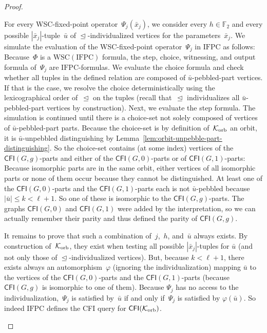 \documentclass[]{lmcs}
\renewcommand{\phi}{\varphi}
\newcommand{\FF}{\mathbb{F}}
\newcommand{\formA}{\Phi}
\newcommand{\formB}{\Psi}
\newcommand{\auto}{\phi}
\newcommand{\tup}[1]{\bar{#1}}
\newcommand{\vertA}{u}
\newcommand{\IFPC}{\ensuremath{\mathrm{IFPC}}}
\newcommand{\WSCof}[1]{\mathrm{WSC}(#1)}
\newcommand{\CFIsym}{\mathsf{CFI}}
\newcommand{\CFI}[1]{\CFIsym(#1)}
\newcommand{\indRel}{\trianglelefteq}
\newenvironment{claimproof}[1][\proofname]{\begin{claimprooftemp}[#1]\renewcommand*{\qedsymbol}{\(\dashv\)}}{\end{claimprooftemp}}
\begin{document}
\begin{proof}
\begin{claimproof}
		For every WSC-fixed-point operator~$\formB_j(\tup{x}_j)$, we consider every $h \in \FF_2$
		and every possible $|\tup{x}_j|$-tuple~$\tup{\vertA}$ of $\indRel$\nobreakdash-individualized vertices for the parameters~$\tup{x}_j$.
		We simulate the evaluation of the WSC-fixed-point operator~$\formB_j$
		in $\IFPC{}$ as follows:
		Because~$\formA$ is a $\WSCof{\IFPC}$ formula,
		the step, choice, witnessing, and output formula of~$\formB_j$
		are $\IFPC$-formulas.
		We evaluate the choice formula and
		check whether all tuples in the defined relation
		are composed of $\tup{\vertA}$\nobreakdash-pebbled-part vertices.
		If that is the case, we resolve the choice deterministically
		using the lexicographical order of~$\indRel$ on the tuples
		(recall that~$\indRel$ individualizes all $\tup{\vertA}$-pebbled-part vertices by construction).
		Next, we evaluate the step formula.
		The simulation is continued
		until there is a choice-set not solely composed of vertices of  $\tup{\vertA}$-pebbled-part parts.
		Because the choice-set is by definition of~$\mathcal{K}_{\text{orb}}$ an orbit,
		it is $\tup{\vertA}$-unpebbled distinguishing
		by Lemma~\ref{lem:orbit-unpebble-part-distinguishing}.
		So the choice-set contains (at some index) vertices of the $\CFI{G,g}$-parts and either of the $\CFI{G,0}$-parts or of $\CFI{G,1}$-parts:
		Because isomorphic parts are in the same orbit, 
		either vertices of all isomorphic parts  or none of them occur
		because they cannot be distinguished.
		At least one of the $\CFI{G,0}$-parts and the $\CFI{G,1}$-parts each is not $\tup{\vertA}$-pebbled because $|\tup{\vertA}| \leq k < \ell+1$.
		So one of these is isomorphic to the $\CFI{G,g}$-parts.
		The graphs $\CFI{G,0}$ and $\CFI{G,1}$ were added by the interpretation,
		so we can actually remember their parity and thus defined the parity of $\CFI{G,g}$.
		
		It remains to prove that such a combination of~$j$,~$h$, and~$\tup{\vertA}$ always exists.
		By construction of~$\mathcal{K}_{\text{orb}}$,
		they exist when testing all possible $|\tup{x}_j|$-tuples for $\tup{\vertA}$
		(and not only those of $\indRel$\nobreakdash-individualized vertices).
		But, because $k < \ell+1 $, there exists always an automorphism~$\auto$ (ignoring the individualization) mapping $\tup{\vertA}$ to the vertices of the $\CFI{G,0}$-parts and the $\CFI{G,1}$-parts (because $\CFI{G,g}$ is isomorphic to one of them). 
		Because $\formB_j$ has no access to the individualization,~$\formB_j$ is satisfied by~$\tup{\vertA}$
		if and only if~$\formB_j$ is satisfied by $\auto(\tup{\vertA})$.
		So indeed \IFPC{} defines the CFI query for $\CFI{\GraphClassOrb}$.
		

\end{claimproof}
\end{proof}
\end{document}
